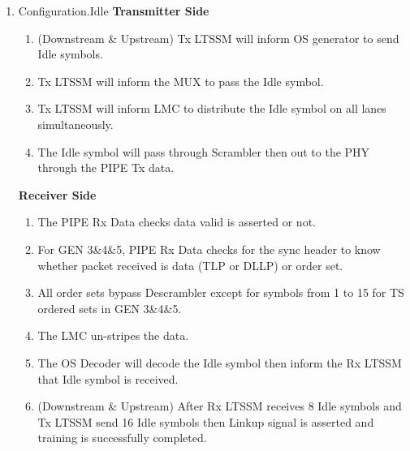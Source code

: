 \begin{enumerate}
\begin{enumerate}
\end{enumerate}
\item Configuration.Idle
\newline\textbf{Transmitter Side}
\begin{enumerate}
  \item (Downstream \& Upstream) Tx LTSSM will inform OS generator to send Idle symbols.
  \item Tx LTSSM will inform the MUX to pass the Idle symbol.
  \item Tx LTSSM will inform LMC to distribute the Idle symbol on all lanes simultaneously.
  \item The Idle symbol will pass through Scrambler then out to the PHY through the PIPE Tx data.
\end{enumerate}
\textbf{Receiver Side}
\begin{enumerate}
  \item The PIPE Rx Data checks data valid is asserted or not.
  \item For GEN 3\&4\&5, PIPE Rx Data checks for the sync header to know whether packet received is data (TLP or DLLP) or order set.
  \item All order sets bypass Descrambler except for symbols from 1 to 15 for TS ordered sets in GEN 3\&4\&5.
  \item The LMC un-stripes the data.
  \item The OS Decoder will decode the Idle symbol then inform the Rx LTSSM that Idle symbol is received.
  \item (Downstream \& Upstream) After Rx LTSSM receives 8 Idle symbols and Tx LTSSM send 16 Idle symbols then Linkup signal is asserted and training is successfully completed.
\end{enumerate}
\end{enumerate}
